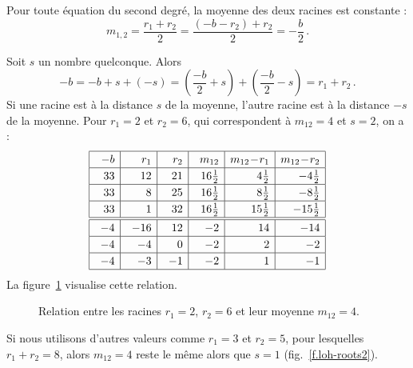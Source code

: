 Pour toute équation du second degré, la moyenne des deux racines est constante :
\[
m_{1,2}=\frac{r_1+r_2}{2}=
\frac{(-b-r_2)+r_2}{2}=
-\frac{b}{2}\,.
\]



Soit $s$ un nombre quelconque. Alors 
\[
-b=-b+s+(-s)=\left(\frac{-b}{2}+s\right) + \left(\frac{-b}{2}-s\right)=r_1+r_2\,.
\]
Si une racine est à la distance $s$ de la moyenne, l'autre racine est à la distance $-s$ de la moyenne. Pour $r_1=2$ et $r_2=6$, qui correspondent à $m_{12}=4$ et $s=2$, on a :
\[
\renewcommand{\arraystretch}{1.2}
\begin{array}{|@{\hspace{1em}}r|@{\hspace{1em}}r|@{\hspace{1em}}r|@{\hspace{1em}}r|r|r|}
\hline
-b& r_1 & r_2 & m_{12}& m_{12}\!-\!r_1 & m_{12}\!-\!r_2\\\hline
33 & 12 & 21 & 16\frac{1}{2}&4\frac{1}{2} & -4\frac{1}{2}  \\\hline
33 & 8 & 25 & 16\frac{1}{2}&8\frac{1}{2}&-8\frac{1}{2}\\\hline
33 & 1 & 32 & 16\frac{1}{2}&15\frac{1}{2}&-15\frac{1}{2}\\\hline
\hline
-4 & -16 & 12 & -2 &14& -14\\\hline
-4 & -4 & 0 & -2&2&-2 \\\hline
-4 & -3 & -1 & -2&1&-1 \\\hline
\end{array}
\]
La figure~\ref{f.loh-roots1} visualise cette relation.

\begin{figure}[htbp]
\centering
{}
\caption{Relation entre les racines $r_1=2$, $r_2=6$ et leur moyenne $m_{12}=4$.}
\label{f.loh-roots1}
\end{figure}
Si nous utilisons d'autres valeurs comme $r_1=3$ et $r_2=5$, pour lesquelles $r_1+r_2=8$, alors $m_{12}=4$ reste le même alors que $s=1$ (fig.~\ref{f.loh-roots2}).

